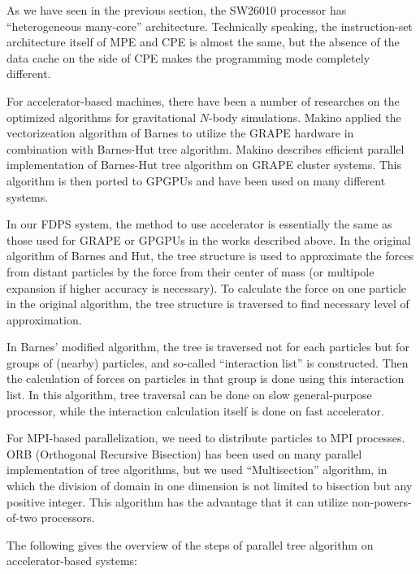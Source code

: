 \documentclass[oribibl]{llncs}
\begin{document}
As we have seen in the previous section, the SW26010 processor has
``heterogeneous many-core'' architecture. Technically speaking, the
instruction-set architecture itself of MPE and CPE is almost the same,
but the absence of the data cache on the side of CPE makes the
programming mode completely different.

For accelerator-based machines, there have been a number of researches
on the optimized algorithms for gravitational $N$-body
simulations. Makino \cite{1991PASJ...43..621M} applied the
vectorizeation algorithm of Barnes \cite{1990JCoPh..87..161B} to
utilize the GRAPE hardware in combination with Barnes-Hut tree
algorithm. Makino \cite{2004PASJ...56..521M} describes efficient
parallel implementation of Barnes-Hut tree algorithm on GRAPE cluster
systems. This algorithm is then ported to GPGPUs \cite{Hamadaetal2009}
and have been used on many different systems.

In our FDPS system, the method to use accelerator is essentially the
same as those used for GRAPE or GPGPUs in the works described above.
In the original algorithm of Barnes and Hut, the tree structure is
used to approximate the forces from distant particles by the force
from their center of mass (or multipole expansion if higher accuracy
is necessary). To calculate the force on one particle in the original
algorithm, the tree structure is traversed to find necessary level of
approximation.

In Barnes' modified algorithm, the tree is traversed not for each
particles but for groups of (nearby) particles, and so-called
``interaction list'' is constructed. Then the calculation of forces on
particles in that group is done using this interaction list. In this
algorithm, tree traversal can be done on slow general-purpose
processor, while the interaction calculation itself is done on fast
accelerator.

For MPI-based parallelization, we need to distribute particles to MPI
processes. ORB (Orthogonal Recursive Bisection) has been used on many
parallel implementation of tree algorithms, but we used
``Multisection'' algorithm, in which the division of domain in one
dimension is not limited to bisection but any positive integer. This
algorithm has the advantage that it can utilize non-powers-of-two
processors.

The following gives the overview of the steps of parallel tree
algorithm on accelerator-based systems:
\end{document}
